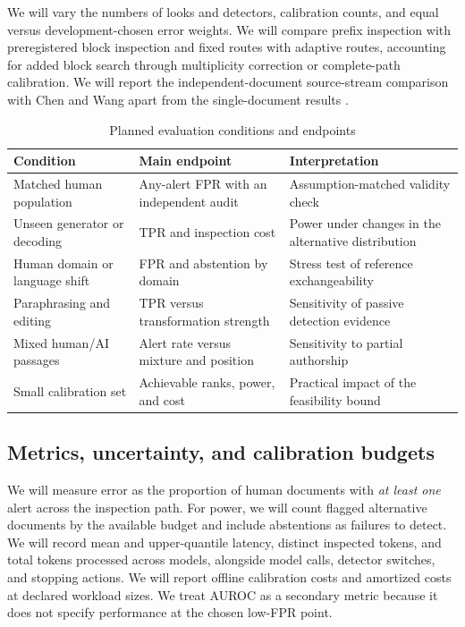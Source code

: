 \documentclass[pdflatex,sn-mathphys-num]{sn-jnl}
\begin{document}
We will vary the numbers of looks and detectors, calibration counts, and equal versus development-chosen error weights. We will compare prefix inspection with preregistered block inspection and fixed routes with adaptive routes, accounting for added block search through multiplicity correction or complete-path calibration. We will report the independent-document source-stream comparison with Chen and Wang apart from the single-document results \citep{chen2025}.

\begin{table}[t]
\caption{Planned evaluation conditions and endpoints}\label{tab:design}
\small
\begin{tabularx}{\textwidth}{@{}>{\raggedright\arraybackslash}p{}YY@{}}
\toprule
Condition & Main endpoint & Interpretation \\
\midrule
Matched human population & Any-alert FPR with an independent audit & Assumption-matched validity check \\
Unseen generator or decoding & TPR and inspection cost & Power under changes in the alternative distribution \\
Human domain or language shift & FPR and abstention by domain & Stress test of reference exchangeability \\
Paraphrasing and editing & TPR versus transformation strength & Sensitivity of passive detection evidence \\
Mixed human/AI passages & Alert rate versus mixture and position & Sensitivity to partial authorship \\
Small calibration set & Achievable ranks, power, and cost & Practical impact of the feasibility bound \\
\bottomrule
\end{tabularx}
\end{table}

\subsection{Metrics, uncertainty, and calibration budgets}

We will measure error as the proportion of human documents with \emph{at least one} alert across the inspection path. For power, we will count flagged alternative documents by the available budget and include abstentions as failures to detect. We will record mean and upper-quantile latency, distinct inspected tokens, and total tokens processed across models, alongside model calls, detector switches, and stopping actions. We will report offline calibration costs and amortized costs at declared workload sizes. We treat AUROC as a secondary metric because it does not specify performance at the chosen low-FPR point.
\end{document}
